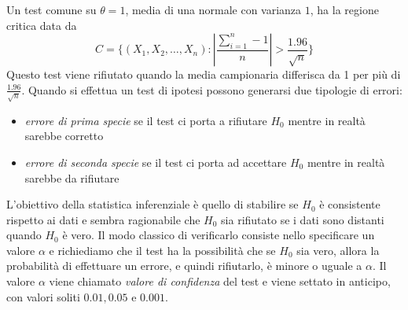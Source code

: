 Un test comune su $\theta = 1$, media di una normale con varianza $1$, ha la regione critica data da
\[ C = \{(X_1, X_2, \dots, X_n) : |\frac{\sum _{i = 1} ^ n - 1}{n}| > \frac{1.96}{\sqrt{n}}\} \]
Questo test viene rifiutato quando la media campionaria differisca da 1 per più di $\frac{1.96}{\sqrt{n}}$.\newline
Quando si effettua un test di ipotesi possono generarsi due tipologie di errori:
\begin{itemize}
    \item \emph{errore di prima specie} se il test ci porta a rifiutare $H_0$ mentre in realtà sarebbe corretto
    \item \emph{errore di seconda specie} se il test ci porta ad accettare $H_0$ mentre in realtà sarebbe da rifiutare
\end{itemize}
L'obiettivo della statistica inferenziale è quello di stabilire se $H_0$ è consistente rispetto ai dati e sembra
ragionabile che $H_0$ sia rifiutato se i dati sono distanti quando $H_0$ è vero.\newline
Il modo classico di verificarlo consiste nello specificare un valore $\alpha$ e richiediamo che il test ha la
possibilità che se $H_0$ sia vero, allora la probabilità di effettuare un errore, e quindi rifiutarlo, è minore o uguale
a $\alpha$.\newline
Il valore $\alpha$ viene chiamato \emph{valore di confidenza} del test e viene settato in anticipo, con valori soliti
$0.01, 0.05 \text{ e } 0.001$.


